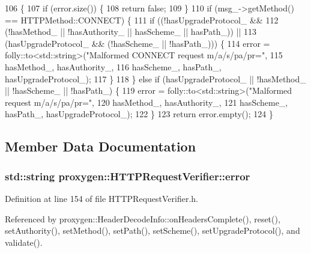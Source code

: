 \begin{DoxyCode}
106                   \{
107     \textcolor{keywordflow}{if} (error.size()) \{
108       \textcolor{keywordflow}{return} \textcolor{keyword}{false};
109     \}
110     \textcolor{keywordflow}{if} (msg_->getMethod() == HTTPMethod::CONNECT) \{
111       \textcolor{keywordflow}{if} ((!hasUpgradeProtocol_ &&
112            (!hasMethod_ || !hasAuthority_ || hasScheme_ || hasPath_)) ||
113           (hasUpgradeProtocol_ && (!hasScheme_ || !hasPath_))) \{
114         error = folly::to<std::string>(\textcolor{stringliteral}{"Malformed CONNECT request m/a/s/pa/pr="},
115                                 hasMethod_, hasAuthority_,
116                                 hasScheme_, hasPath_, hasUpgradeProtocol_);
117       \}
118     \} \textcolor{keywordflow}{else} \textcolor{keywordflow}{if} (hasUpgradeProtocol_ || !hasMethod_ || !hasScheme_ || !hasPath_) \{
119       error = folly::to<std::string>(\textcolor{stringliteral}{"Malformed request m/a/s/pa/pr="},
120                                 hasMethod_, hasAuthority_,
121                                 hasScheme_, hasPath_, hasUpgradeProtocol_);
122     \}
123     \textcolor{keywordflow}{return} error.empty();
124   \}
\end{DoxyCode}


\subsection{Member Data Documentation}
\subsubsection[{error}]{\setlength{\rightskip}{0pt plus 5cm}std\+::string proxygen\+::\+H\+T\+T\+P\+Request\+Verifier\+::error}\label{classproxygen_1_1HTTPRequestVerifier_a57c0c90d3bcce09f42cf495379cb75ff}


Definition at line 154 of file H\+T\+T\+P\+Request\+Verifier.\+h.



Referenced by proxygen\+::\+Header\+Decode\+Info\+::on\+Headers\+Complete(), reset(), set\+Authority(), set\+Method(), set\+Path(), set\+Scheme(), set\+Upgrade\+Protocol(), and validate().

